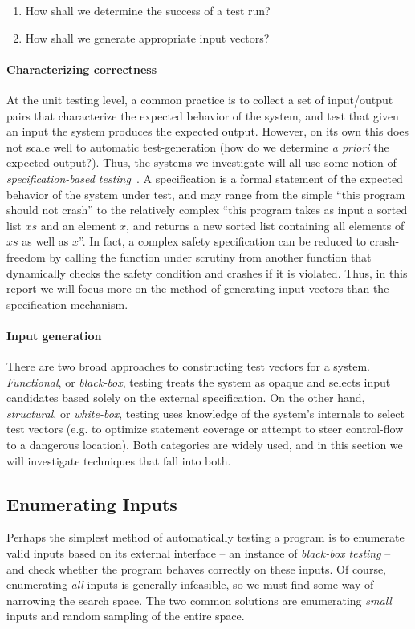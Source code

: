 \begin{enumerate}
\item How shall we determine the success of a test run?
\item How shall we generate appropriate input vectors?
\end{enumerate}

\paragraph{Characterizing correctness}
At the unit testing level, a common practice is to collect a set of
input/output pairs that characterize the expected behavior of the
system, and test that given an input the system produces the expected
output.
%
However, on its own this does not scale well to automatic
test-generation (how do we determine \emph{a priori} the expected
output?).
%
Thus, the systems we investigate will all use some notion of
\emph{specification-based testing}~\cite{laycock_theory_1993}.
%
A specification is a formal statement of the expected behavior of the
system under test, and may range from the simple ``this program should
not crash'' to the relatively complex ``this program takes as input a
sorted list $xs$ and an element $x$, and returns a new sorted list
containing all elements of $xs$ as well as $x$''.
%
In fact, a complex safety specification can be reduced to crash-freedom
by calling the function under scrutiny from another function that
dynamically checks the safety condition and crashes if it is violated.
%
Thus, in this report we will focus more on the method of generating
input vectors than the specification mechanism.

\paragraph{Input generation}
There are two broad approaches to constructing test vectors for a
system.
%
\emph{Functional}, or \emph{black-box}, testing treats the
system as opaque and selects input candidates based solely on the
external specification.
%
On the other hand, \emph{structural}, or \emph{white-box}, testing uses
knowledge of the system's internals to select test vectors (e.g. to
optimize statement coverage or attempt to steer control-flow to a
dangerous location).
%
Both categories are widely used, and in this section we will investigate
techniques that fall into both.

\subsection{Enumerating Inputs}
\label{sec:enumerating-inputs}
Perhaps the simplest method of automatically testing a program is to
enumerate valid inputs based on its external interface -- an instance of
\emph{black-box testing} \cite{adrion_validation_1982} -- and check
whether the program behaves correctly on these inputs.
%
Of course, enumerating \emph{all} inputs is generally infeasible, so we
must find some way of narrowing the search space.
%
The two common solutions are enumerating \emph{small} inputs and random
sampling of the entire space.

